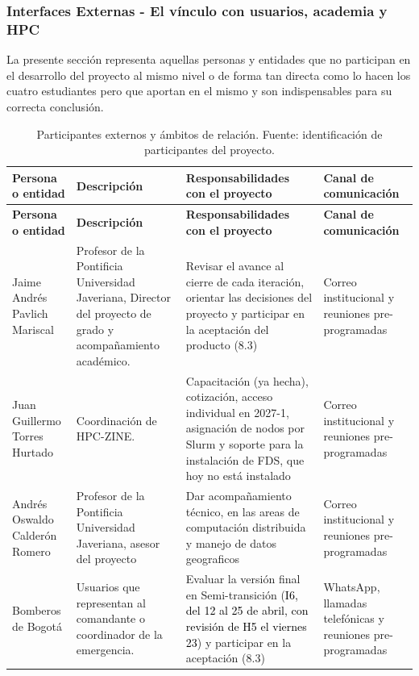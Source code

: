 \subsubsection{Interfaces Externas - El vínculo con usuarios, academia y HPC}\label{sec:spmp-8-4-1}
La presente sección representa aquellas personas y entidades que no participan en el desarrollo del proyecto al mismo nivel o de forma tan directa como lo hacen los cuatro estudiantes pero que aportan en el mismo y son indispensables para su correcta conclusión.
\begin{longtable}{|
p{0.20\dimexpr\linewidth-8\tabcolsep-5\arrayrulewidth\relax}|
p{0.25\dimexpr\linewidth-8\tabcolsep-5\arrayrulewidth\relax}|
p{0.35\dimexpr\linewidth-8\tabcolsep-5\arrayrulewidth\relax}|
p{0.20\dimexpr\linewidth-8\tabcolsep-5\arrayrulewidth\relax}|}
\caption{Participantes externos y ámbitos de relación. Fuente: identificación de participantes del proyecto.}\\\hline
  \textbf{Persona o entidad} & \textbf{Descripción} & \textbf{Responsabilidades con el proyecto} & \textbf{Canal de comunicación}\\\hline
\endfirsthead\hline
\textbf{Persona o entidad} & \textbf{Descripción} &\textbf{Responsabilidades con el proyecto} & \textbf{Canal de comunicación}\\\hline
\endhead
Jaime Andrés Pavlich Mariscal & Profesor de la Pontificia Universidad Javeriana, Director del proyecto de grado y acompañamiento académico.& Revisar el avance al cierre de cada iteración, orientar las decisiones del proyecto y participar en la aceptación del producto (8.3) & Correo institucional y reuniones pre-programadas\\\hline
Juan Guillermo Torres Hurtado & Coordinación de HPC-ZINE. & Capacitación (ya hecha), cotización, acceso individual en 2027-1, asignación de nodos por Slurm y soporte para la instalación de FDS, que hoy no está instalado & Correo institucional y reuniones pre-programadas\\\hline
Andrés Oswaldo Calderón Romero & Profesor de la Pontificia Universidad Javeriana, asesor del proyecto & Dar acompañamiento técnico, en las areas de computación distribuida y manejo de datos geograficos & Correo institucional y reuniones pre-programadas\\\hline
Bomberos de Bogotá & Usuarios que representan al comandante o coordinador de la emergencia.& Evaluar la versión final en Semi-transición (\textcolor{black}{I6, del 12 al 25 de abril, con revisión de H5 el viernes 23}) y participar en la aceptación (8.3) & WhatsApp, llamadas telefónicas y reuniones pre-programadas\\\hline

\end{longtable}
